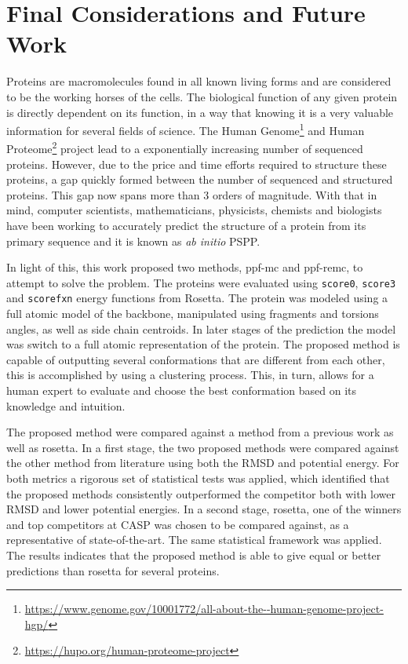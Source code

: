 \chapter{Final Considerations and Future Work}
\label{chap:final_considerations}

Proteins are macromolecules found in all known living forms and are
considered to be the working horses of the cells. The biological
function of any given protein is directly dependent on its
function, in a way that knowing it is a very valuable information
for several fields of science. The Human
Genome\footnote{\url{https://www.genome.gov/10001772/all-about-the--human-genome-project-hgp/}}
and Human Proteome\footnote{\url{https://hupo.org/human-proteome-project}} project
lead to a exponentially increasing number of sequenced proteins.
However, due to the price and time efforts required to structure
these proteins, a gap quickly formed between the number of sequenced
and structured proteins. This gap now spans more than 3 orders
of magnitude. With that in mind, computer scientists, mathematicians,
physicists, chemists and biologists have been working to accurately
predict the structure of a protein from its primary
sequence and it is known as \textit{ab initio} PSPP.

In light of this, this work proposed two methods, ppf-mc and
ppf-remc, to attempt to solve the problem. The proteins were evaluated
using \texttt{score0}, \texttt{score3} and \texttt{scorefxn} energy functions
from Rosetta. The protein was modeled using a full atomic model of the backbone,
manipulated using fragments and torsions angles, as well as side chain centroids.
In later stages of the prediction the model was switch to a full atomic
representation of the protein. The proposed method is capable of outputting
several conformations that are different from each other, this is accomplished
by using a clustering process. This, in turn, allows for a human expert to
evaluate and choose the best conformation based on its knowledge and intuition.

The proposed method were compared against a method from a previous work as
well as rosetta. In a first stage, the two proposed methods were compared
against the other method from literature using both the RMSD and potential energy.
For both metrics a rigorous set of statistical tests was applied, which identified that
the proposed methods consistently outperformed the competitor both with lower
RMSD and lower potential energies. In a second stage, rosetta, one of the
winners and top competitors at CASP was chosen to be compared against, as a
representative of state-of-the-art. The same statistical framework was applied.
The results indicates that the proposed method is able to give equal or better
predictions than rosetta for several proteins.

